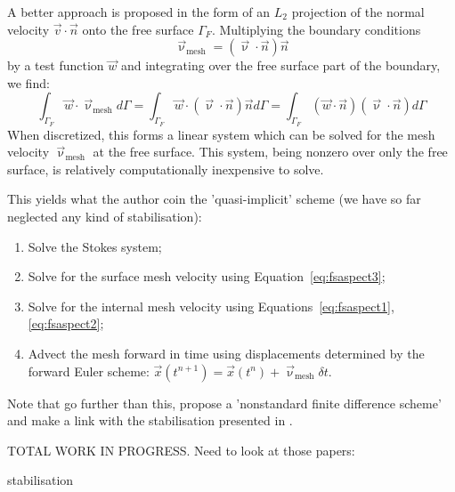 A better approach is proposed in the form of an $L_2$ projection of the 
normal velocity $\vec{v}\cdot\vec{n}$ onto the free surface $\Gamma_F$. 
Multiplying the boundary conditions 
\[
\vec{\upnu}_{\text{mesh}} = (\vec{\upnu}\cdot\vec{n})\vec{n} 
\]
by a test function $\vec{w}$ and integrating over the free surface part of the boundary, we find:
\begin{equation}
\int_{\Gamma_F} \vec{w}\cdot\vec{\upnu}_{\text{mesh}} d\Gamma 
=
\int_{\Gamma_F} \vec{w}\cdot (\vec{\upnu}\cdot\vec{n})\vec{n} d\Gamma
=
\int_{\Gamma_F} (\vec{w}\cdot\vec{n}) (\vec{\upnu}\cdot\vec{n}) d\Gamma \label{eq:fsaspect3}
\end{equation}
When discretized, this forms a linear system which can be
solved for the mesh velocity $\vec{\upnu}_{\text{mesh}}$ 
at the free surface. 
This system, being nonzero over only the
free surface, is relatively computationally inexpensive to solve.

This yields what the author coin the 'quasi-implicit' scheme 
(we have so far neglected any kind of stabilisation):
\begin{enumerate}
\item Solve the Stokes system;
\item Solve for the surface mesh velocity using Equation~\ref{eq:fsaspect3};
\item Solve for the internal mesh velocity using Equations~\ref{eq:fsaspect1}, \ref{eq:fsaspect2}; 
\item Advect the mesh forward in time using displacements determined by
the forward Euler scheme: $\vec{x}(t^{n+1} ) = \vec{x}(t^n ) + \vec{\upnu}_{\text{mesh}} \delta t$.
\end{enumerate}

Note that \cite{robh17} go further than this, propose a 'nonstandard finite difference scheme' and 
make a link with the stabilisation presented in \cite{kamm10}.

\vspace{1cm}
TOTAL WORK IN PROGRESS. Need to look at those papers:
\cite{huli88}
\cite{dumg11}
\cite{dumy16} 
\cite{anmp15}
\cite{krwd12}
\cite{stcl10}

stabilisation \cite{kamm10,qube11,dumg11}
